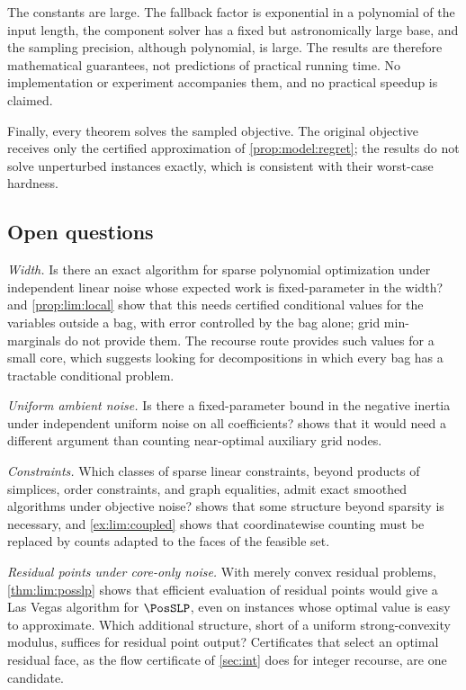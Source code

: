 The constants are large. The fallback factor is exponential in a polynomial
of the input length, the component solver has a fixed but astronomically
large base, and the sampling precision, although polynomial, is large. The
results are therefore mathematical guarantees, not predictions of practical
running time. No implementation or experiment accompanies them, and no
practical speedup is claimed.

Finally, every theorem solves the sampled objective. The original objective
receives only the certified approximation of \cref{prop:model:regret}; the
results do not solve unperturbed instances exactly, which is consistent with
their worst-case hardness.

\subsection{Open questions}\label{sec:disc:open}

\emph{Width.} Is there an exact algorithm for sparse polynomial optimization
under independent linear noise whose expected work is fixed-parameter in the
width?  and \cref{prop:lim:local} show that this needs
certified conditional values for the variables outside a bag, with error
controlled by the bag alone; grid min-marginals do not provide them. The
recourse route provides such values for a small core, which suggests looking
for decompositions in which every bag has a tractable conditional problem.

\emph{Uniform ambient noise.} Is there a fixed-parameter bound in the negative
inertia under independent uniform noise on all coefficients?
 shows that it would need a different argument than
counting near-optimal auxiliary grid nodes.

\emph{Constraints.} Which classes of sparse linear constraints, beyond
products of simplices, order constraints, and graph equalities, admit exact
smoothed algorithms under objective noise?  shows
that some structure beyond sparsity is necessary, and
\cref{ex:lim:coupled} shows that coordinatewise counting must be replaced by
counts adapted to the faces of the feasible set.

\emph{Residual points under core-only noise.} With merely convex residual
problems, \cref{thm:lim:posslp} shows that efficient evaluation of residual
points would give a Las Vegas algorithm for $\PosSLP$, even on instances
whose optimal value is easy to approximate. Which additional structure,
short of a uniform strong-convexity modulus, suffices for residual point
output? Certificates that select an optimal residual face, as the flow
certificate of \cref{sec:int} does for integer recourse, are one candidate.

